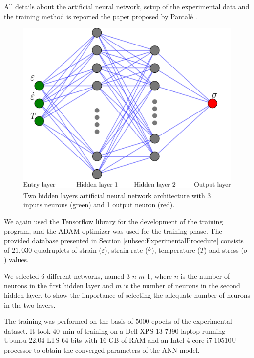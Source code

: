 \documentclass[metals,article,submit,pdftex,moreauthors]{Definitions/mdpi}
\DeclareRobustCommand{\mdot}[1]{\accentset{\mbox{\bfseries .}}{#1}}
\begin{document}
All details about the artificial neural network, setup of the experimental data and the training method is reported the paper proposed by Pantalé \cite{Pantale-2023}.

\begin{figure}[H]
\includegraphics[width=0.7\columnwidth]{Figures/ANN-scheme-2HL}
\caption{Two hidden layers artificial neural network architecture with 3 inputs neurons (green) and 1 output neuron (red).}
\label{fig:ANN-2HL}
\end{figure}

We again used the Tensorflow library for the development of the training program, and the ADAM optimizer was used for the training phase.
The provided database presented in Section \ref{subsec:ExperimentalProcedure} consists of $21,030$ quadruplets of strain ($\varepsilon$), strain rate ($\mdot\varepsilon$), temperature ($T$) and stress ($\sigma$) values.

We selected 6 different networks, named 3-$n$-$m$-1, where $n$ is the number of neurons in the first hidden layer and $m$ is the number of neurons in the second hidden layer, to show the importance of selecting the adequate number of neurons in the two layers.

The training was performed on the basis of $5000$ epochs of the experimental dataset.
It took $40$~min of training on a Dell XPS-13 7390 laptop running Ubuntu 22.04 LTS 64 bits with 16 GB of RAM and an Intel 4-core i7-10510U processor to obtain the converged parameters of the ANN model.
\end{document}
